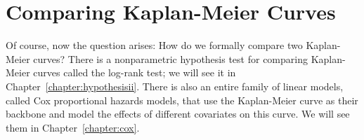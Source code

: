 
\section{Comparing Kaplan-Meier Curves}

Of course, now the question arises: How do we formally compare two Kaplan-Meier curves? There is a nonparametric hypothesis test for comparing Kaplan-Meier curves called the log-rank test; we will see it in Chapter~\ref{chapter:hypothesisii}. There is also an entire family of linear models, called Cox proportional hazards models, that use the Kaplan-Meier curve as their backbone and model the effects of different covariates on this curve. We will see them in Chapter~\ref{chapter:cox}.
\vspace{5mm}

